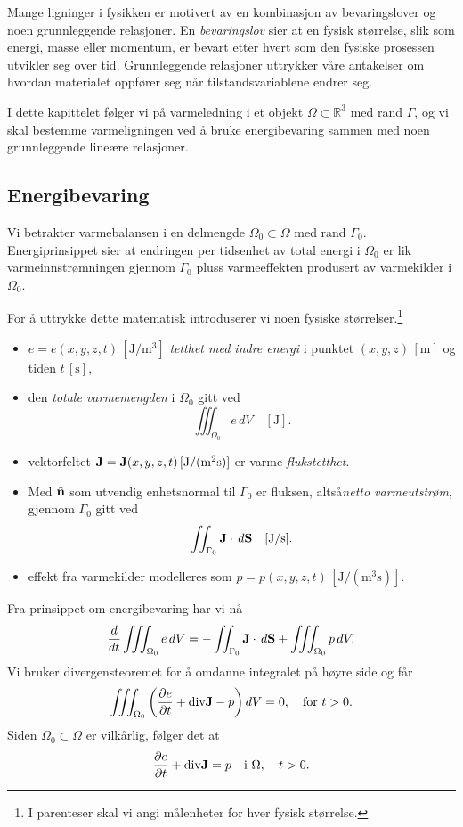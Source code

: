 Mange ligninger i fysikken er motivert av en kombinasjon av bevaringslover og noen grunnleggende relasjoner. En \emph{bevaringslov} sier at en fysisk størrelse, slik som energi, masse eller momentum, er bevart etter hvert som den fysiske prosessen utvikler seg over tid. Grunnleggende relasjoner uttrykker våre antakelser om hvordan materialet oppfører seg når tilstandsvariablene endrer seg. 

I dette kapittelet følger vi \cite[1.3 Physical Derivation of the Heat Equation]{LaT03} på varmeledning i et objekt \( \Omega \subset \mathbb{R}^3 \) med rand \( \Gamma \), og vi skal bestemme varmeligningen ved å bruke energibevaring sammen med noen grunnleggende lineære relasjoner.

\subsection*{Energibevaring}

Vi betrakter varmebalansen i en delmengde \( \Omega_0 \subset \Omega \) med rand \( \Gamma_0 \). Energiprinsippet sier at endringen per tidsenhet av total energi i \( \Omega_0 \) er lik varmeinnstrømningen gjennom \( \Gamma_0 \) pluss varmeeffekten produsert av varmekilder i \( \Omega_0 \).

For å uttrykke dette matematisk introduserer vi noen fysiske størrelser.\footnote{I parenteser skal vi angi målenheter for hver fysisk størrelse.}
\begin{itemize}
\item \( e = e(x,y,z, t) \, [\mathrm{J/m^3}] \) \emph{tetthet med indre energi} i punktet \( (x,y,z) \, [\mathrm{m}] \) og tiden \( t \, [\mathrm{s}] \),
\item den \emph{totale varmemengden} i \( \Omega_0 \) gitt ved
\[
\iiint_{\Omega_0} e \, dV \quad [\mathrm{J}].
\]
\item vektorfeltet \( \mathbf{J} = \mathbf{J}(x,y,z,t) \, [\mathrm{J/(m^2 s)}] \) er varme-\emph{flukstetthet}.
\item Med \( \hat{\mathbf{n}} \) som utvendig enhetsnormal til \( \Gamma_0 \) er fluksen, altså\emph{netto varmeutstrøm}, gjennom \( \Gamma_0 \) gitt ved
\[
\iint_{\Gamma_0} \mathbf{J} \cdot \, d\mathbf{S} \quad [\mathrm{J/s}].
\]
\item effekt fra varmekilder modelleres som \( p = p(x,y,z,t) \, [\mathrm{J/(m^3 s)}] \).
\end{itemize}
Fra prinsippet om energibevaring har vi nå 
\[
\frac{d}{dt} \iiint_{\Omega_0} e \, dV = - \iint_{\Gamma_0} \mathbf{J} \cdot \, d\mathbf{S} + \iiint_{\Omega_0} p \, dV.
\]
Vi bruker divergensteoremet  for å omdanne integralet på høyre side og får 
\[
\iiint_{\Omega_0} \left( \frac{\partial e}{\partial t} + \text{div} \mathbf{J} - p \right) dV = 0, \quad \text{for } t > 0.
\]
Siden \( \Omega_0 \subset \Omega \) er vilkårlig, følger det at
\begin{equation}
\frac{\partial e}{\partial t} + \text{div} \mathbf{J} = p \quad \text{i } \Omega, \quad t > 0.
\label{eq:energy}
\end{equation}

